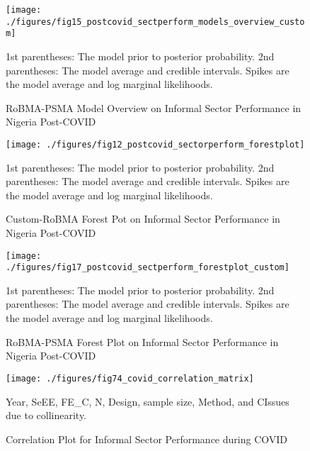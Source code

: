 \documentclass[12pt, english]{article}
\begin{document}
    \begin{figure}[H]
        \centering
        \texttt{[image: ./figures/fig15\_postcovid\_sectperform\_models\_overview\_custom]}
        \caption{RoBMA-PSMA Model Overview on Informal Sector Performance in Nigeria Post-COVID}
        \label{fig19:custom-robma-model-overview-postcovid}
        \begin{minipage}{10cm}
            \vspace{0.1cm}
            \small 1st parentheses: The model prior to posterior probability. 2nd parentheses: The model average and credible intervals. Spikes are the model average and log marginal likelihoods.
        \end{minipage}
    \end{figure}

    \begin{figure}[H]
        \centering
        \texttt{[image: ./figures/fig12\_postcovid\_sectorperform\_forestplot]}
        \caption{Custom-RoBMA Forest Pot on Informal Sector Performance in Nigeria Post-COVID}
        \label{fig20:robma-psma-forest-plot-covid}
        \begin{minipage}{10cm}
            \vspace{0.1cm}
            \small 1st parentheses: The model prior to posterior probability. 2nd parentheses: The model average and credible intervals. Spikes are the model average and log marginal likelihoods.
        \end{minipage}
    \end{figure}

    \begin{figure}[H]
        \centering
        \texttt{[image: ./figures/fig17\_postcovid\_sectperform\_forestplot\_custom]}
        \caption{RoBMA-PSMA Forest Plot on Informal Sector Performance in Nigeria Post-COVID}
        \label{fig21:custom-robma-forest-plot-covid}
        \begin{minipage}{10cm}
            \vspace{0.1cm}
            \small 1st parentheses: The model prior to posterior probability. 2nd parentheses: The model average and credible intervals. Spikes are the model average and log marginal likelihoods.
        \end{minipage}
    \end{figure}

    \begin{figure}[p]
        \centering
        \texttt{[image: ./figures/fig74\_covid\_correlation\_matrix]}
        \caption{Correlation Plot for Informal Sector Performance during COVID}
        \label{fig22:corrplot-inform-sector-tcovid}
        \begin{minipage}{10cm}
            \vspace{.1cm}
            \small Year, SeEE, FE\_C, N, Design, sample size, Method, and CIssues due to collinearity.
        \end{minipage}
    \end{figure}
\end{document}

